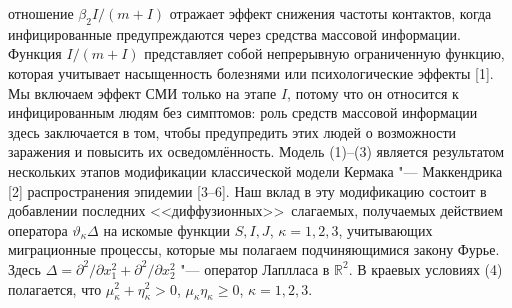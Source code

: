 отношение $\beta_2I/(m+I)$ отражает эффект снижения частоты
контактов, когда инфицированные предупреждаются через средства
массовой информации. Функция $I/(m+I)$ представляет собой
непрерывную ограниченную функцию, которая учитывает насыщенность
болезнями или психологические эффекты [1]. Мы включаем эффект СМИ
только на этапе $I$,  потому что он относится к инфицированным
людям без симптомов: роль средств массовой информации здесь
заключается в том, чтобы предупредить этих людей о возможности
заражения и повысить их осведомлённость. Модель (1)--(3) является
результатом нескольких этапов модификации классической модели
Кермака "--- Маккендрика [2] распространения эпидемии [3--6]. Наш
вклад в эту модификацию состоит в добавлении последних
<<диффузионных>>\ слагаемых, получаемых действием оператора
$\vartheta_\kappa\Delta$ на искомые функции $S, I, J$,
$\kappa=1,2,3$, учитывающих миграционные процессы, которые мы
полагаем подчиняющимися закону Фурье. Здесь
$\Delta=\partial^2/\partial x_1^2+\partial^2/\partial x_2^2$ "---
оператор Лаплласа в $\mathbb{R}^2$. В краевых условиях (4)
полагается, что $\mu_\kappa^2+\eta_\kappa^2>0$, $\mu_\kappa
\eta_\kappa\geqslant 0$, $\kappa=1,2,3$.

